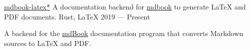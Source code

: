 \showoff
{\textcolor{my-blue}{\href{https://liambeckman.com/mdbook-latex}{mdbook-latex\textcolor{my-red}{*}}}}
{A documentation backend for \textcolor{my-blue}{\href{https://github.com/rust-lang/mdBook}{mdbook}} to generate \LaTeX{} and PDF documents.}
{Rust, \LaTeX{}}
{2019 --- Present}

A backend for the \textcolor{my-blue}{\href{https://github.com/rust-lang/mdBook}{mdBook}} documentation program that converts Markdown sources to \LaTeX{} and PDF.

